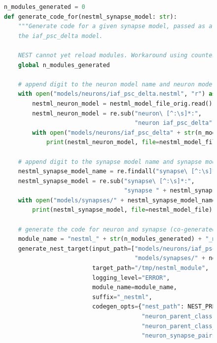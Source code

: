 \begin{figure}[ht!]
\begin{lstlisting}[language=Python, label=lst:generating_code, caption={The code-generation phase}]
n_modules_generated = 0
def generate_code_for(nestml_synapse_model: str):
    """Generate code for a given synapse model, passed as a string, in combination with
    the iaf_psc_delta model.

    NEST cannot yet reload modules. Workaround using counter to generate unique names."""
    global n_modules_generated

    # append digit to the neuron model name and neuron model filename
    with open("models/neurons/iaf_psc_delta.nestml", "r") as nestml_model_file_orig:
        nestml_neuron_model = nestml_model_file_orig.read()
        nestml_neuron_model = re.sub("neuron\ [^:\s]*:",
                                     "neuron iaf_psc_delta" + str(n_modules_generated) + ":", nestml_neuron_model)
        with open("models/neurons/iaf_psc_delta" + str(n_modules_generated) + ".nestml", "w") as nestml_model_file_mod:
            print(nestml_neuron_model, file=nestml_model_file_mod)

    # append digit to the synapse model name and synapse model filename
    nestml_synapse_model_name = re.findall("synapse\ [^:\s]*:", nestml_synapse_model)[0][8:-1]
    nestml_synapse_model = re.sub("synapse\ [^:\s]*:",
                                  "synapse " + nestml_synapse_model_name + str(n_modules_generated) + ":", nestml_synapse_model)
    with open("models/synapses/" + nestml_synapse_model_name + str(n_modules_generated) + ".nestml", "w") as nestml_model_file:
        print(nestml_synapse_model, file=nestml_model_file)

    # generate the code for neuron and synapse (co-generated)
    module_name = "nestml_" + str(n_modules_generated) + "_module"
    generate_nest_target(input_path=["models/neurons/iaf_psc_delta" + str(n_modules_generated) + ".nestml",
                                     "models/synapses/" + nestml_synapse_model_name + str(n_modules_generated) + ".nestml"],
                         target_path="/tmp/nestml_module",
                         logging_level="ERROR",
                         module_name=module_name,
                         suffix="_nestml",
                         codegen_opts={"nest_path": NEST_PREFIX,
                                       "neuron_parent_class": "StructuralPlasticityNode",
                                       "neuron_parent_class_include": "structural_plasticity_node.h",
                                       "neuron_synapse_pairs": [{"neuron": "iaf_psc_delta" + str(n_modules_generated),
                                                                   "synapse": nestml_synapse_model_name + str(n_modules_generated),
                                                                   "post_ports": ["post_spikes"]}]})


\end{lstlisting}
\end{figure}

